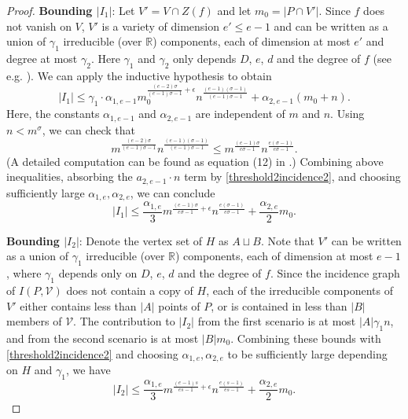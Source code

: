 \documentclass[11pt]{article}
\theoremstyle{definition}
\begin{document}
\begin{proof}
\noindent \textbf{Bounding $|I_1|$}: Let $V' = V \cap Z(f)$ and let $m_0 = |P \cap V'|$. Since $f$ does not vanish on $V$, $V'$ is a variety of dimension $e' \leq e-1$ and can be written as a union of $\gamma_1$ irreducible (over $\mathbb{R}$) components, each of dimension at most $e'$ and degree at most $\gamma_2$. Here $\gamma_1$ and $\gamma_2$ only depends $D$, $e$, $d$ and the degree of $f$ (see e.g. \cite{galligo1995complexity}). We can apply the inductive hypothesis to obtain\begin{equation*}
    |I_1| \leq  \gamma_1 \cdot \alpha_{1,e-1}m_0^{\frac{(e-2)\sigma}{(e-1)\sigma-1}+\epsilon}n^{\frac{(e-1)(\sigma-1)}{(e-1)\sigma-1}}+\alpha_{2,e-1}(m_0+n).
\end{equation*} Here, the constants $\alpha_{1,e-1}$ and $\alpha_{2,e-1}$ are independent of $m$ and $n$. Using $n<m^\sigma$, we can check that\begin{equation*}
    m^{\frac{(e-2)\sigma}{(e-1)\sigma-1}}n^{\frac{(e-1)(\sigma-1)}{(e-1)\sigma-1}} \leq  m^{\frac{(e-1)\sigma}{e\sigma-1}}n^{\frac{e(\sigma-1)}{e\sigma-1}}.
\end{equation*} (A detailed computation can be found as equation (12) in \cite{fox2017semi}.) Combining above inequalities, absorbing the $a_{2,e-1}\cdot n$ term by \eqref{threshold2incidence2}, and choosing sufficiently large $\alpha_{1,e},\alpha_{2,e}$, we can conclude\begin{equation}\label{boundingI1}
    |I_1| \leq \frac{\alpha_{1,e}}{3}m^{\frac{(e-1)\sigma}{e\sigma-1}+\epsilon}n^{\frac{e(\sigma-1)}{e\sigma-1}}+\frac{\alpha_{2,e}}{2}m_0.
\end{equation}

\noindent \textbf{Bounding $|I_2|$}: Denote the vertex set of $H$ as $A \sqcup B$. Note that $V'$ can be written as a union of $\gamma_1$ irreducible (over $\mathbb{R}$) components, each of dimension at most $e-1$, where $\gamma_1$ depends only on $D$, $e$, $d$ and the degree of $f$. Since the incidence graph of $I(P,\mathcal{V})$ does not contain a copy of $H$, each of the irreducible components of $V'$ either contains less than $|A|$ points of $P$, or is contained in less than $|B|$ members of $\mathcal{V}$. The contribution to $|I_2|$ from the first scenario is at most $|A| \gamma_1 n$, and from the second scenario is at most $|B|m_0$. Combining these bounds with \eqref{threshold2incidence2} and choosing $\alpha_{1,e},\alpha_{2,e}$ to be sufficiently large depending on $H$ and $\gamma_1$, we have
\begin{equation}\label{boundingI2}
|I_2| \le \frac{\alpha_{1,e}}{3}m^{\frac{(e-1)s}{es-1}+\epsilon}n^{\frac{e(s-1)}{es-1}}+\frac{\alpha_{2,e}}{2}m_0.
\end{equation}


\end{proof}
\end{document}
